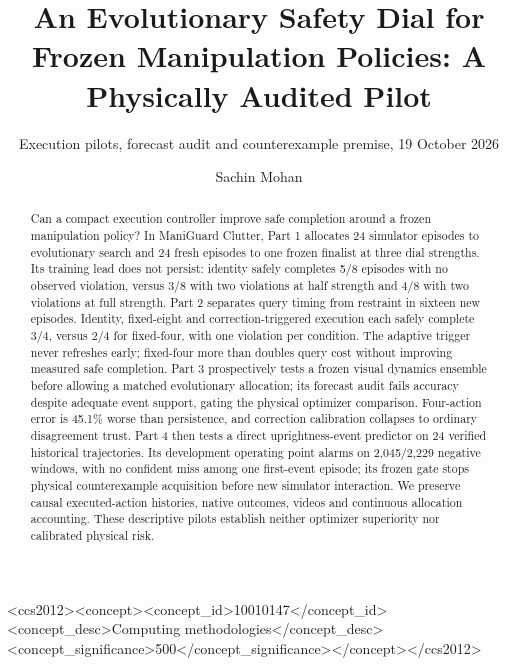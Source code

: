 \documentclass[sigconf,dvipsnames]{acmart}
\begin{document}
\title{An Evolutionary Safety Dial for Frozen Manipulation Policies: A Physically Audited Pilot}
\subtitle{Execution pilots, forecast audit and counterexample premise, 19 October 2026}
\author{Sachin Mohan}
\renewcommand{\shortauthors}{Mohan}
\begin{abstract}
Can a compact execution controller improve safe completion around a frozen
manipulation policy? In ManiGuard Clutter, Part 1 allocates 24 simulator episodes
to evolutionary search and 24 fresh episodes to one frozen finalist at three dial
strengths. Its training lead does not persist: identity safely completes 5/8 episodes
with no observed violation, versus 3/8 with two violations at half strength and 4/8
with two violations at full strength. Part 2 separates query timing from restraint
in sixteen new episodes. Identity, fixed-eight and correction-triggered execution
each safely complete 3/4, versus 2/4 for fixed-four, with one violation per condition.
The adaptive trigger never refreshes early; fixed-four more than doubles query
cost without improving measured safe completion. Part 3 prospectively tests a
frozen visual dynamics ensemble before allowing a matched evolutionary allocation;
its forecast audit fails accuracy despite adequate event support, gating the
physical optimizer comparison. Four-action error is 45.1\% worse than persistence,
and correction calibration collapses to ordinary disagreement trust. Part 4 then
tests a direct uprightness-event predictor on 24 verified historical trajectories.
Its development operating point alarms on 2,045/2,229 negative windows, with no
confident miss among one first-event episode; its frozen gate stops physical
counterexample acquisition before new simulator interaction. We preserve
causal executed-action histories, native outcomes, videos and continuous allocation
accounting. These descriptive pilots establish neither optimizer superiority nor
calibrated physical risk.
\end{abstract}
\begin{CCSXML}
<ccs2012><concept><concept_id>10010147</concept_id>
<concept_desc>Computing methodologies</concept_desc>
<concept_significance>500</concept_significance></concept></ccs2012>
\end{CCSXML}
\maketitle
\end{document}
